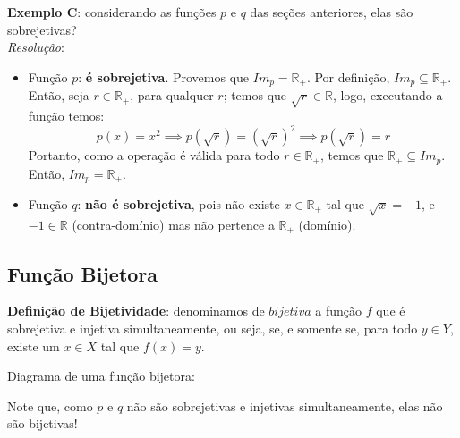\documentclass[13pt,letterpaper]{article}
\begin{document}
\textbf{Exemplo C}: considerando as funções $p$ e $q$ das seções anteriores, elas são sobrejetivas? \\
\emph{Resolução}:
\begin{itemize}
    \item Função $p$: \textbf{é sobrejetiva}. Provemos que $Im_p = \mathbb{R_+}$. Por definição, $Im_p \subseteq \mathbb{R_+}$. Então, seja $r \in \mathbb{R_+}$, para qualquer $r$; temos que $\sqrt{r} \in \mathbb{R}$, logo, executando a função temos:
    \begin{displaymath}
        p(x) = x^2 \implies p(\sqrt{r}) = (\sqrt{r})^2 \implies p(\sqrt{r}) = r
    \end{displaymath}
    Portanto, como a operação é válida para todo $r \in \mathbb{R_+}$, temos que $\mathbb{R_+} \subseteq Im_p$. Então, $Im_p = \mathbb{R_+}$.
    
    \item Função $q$: \textbf{não é sobrejetiva}, pois não existe $x \in \mathbb{R_+}$ tal que $\sqrt{x} = -1$, e $-1 \in \mathbb{R}$ (contra-domínio) mas não pertence a $\mathbb{R_+}$ (domínio).

\end{itemize}

\subsection{Função Bijetora}
\textbf{Definição de Bijetividade}: denominamos de $bijetiva$ a função $f$ que é sobrejetiva e injetiva simultaneamente, ou seja, se, e somente se, para todo $y \in Y$, existe um $x \in X$ tal que $f(x) = y$.

Diagrama de uma função bijetora:
\begin{center}
\end{center}
Note que, como $p$ e $q$ não são sobrejetivas e injetivas simultaneamente, elas não são bijetivas!
\end{document}
